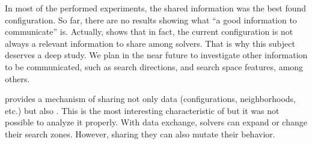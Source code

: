 In most of the performed experiments, the shared information was the best found configuration. So far, there are no results showing what ``a good information to communicate'' is. Actually, \cite{Caniou14} shows that in fact, the current configuration is not always a relevant information to share among solvers. That is why this subject deserves a deep study. We plan in the near future to investigate other information to be communicated, such as search directions, and search space features, among others.

\posl{} provides a mechanism of sharing not only data (\ie configurations, neighborhoods, etc.) but also \oms{}. This is the most interesting characteristic of \posl{} but it was not possible to analyze it properly. With data exchange, solvers can expand or change their search zones. However, sharing \ms{} they can also mutate their behavior. %